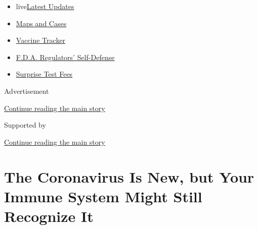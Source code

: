\begin{itemize}
\tightlist
\item
  live\href{https://www.nytimes3xbfgragh.onion/2020/09/11/world/covid-19-coronavirus.html?name=styln-coronavirus-national\&region=TOP_BANNER\&block=storyline_menu_recirc\&action=click\&pgtype=Article\&impression_id=a73af7b0-f4bc-11ea-a147-e379c6aa6545\&variant=undefined}{Latest
  Updates}
\item
  \href{https://www.nytimes3xbfgragh.onion/interactive/2020/us/coronavirus-us-cases.html?name=styln-coronavirus-national\&region=TOP_BANNER\&block=storyline_menu_recirc\&action=click\&pgtype=Article\&impression_id=a73af7b1-f4bc-11ea-a147-e379c6aa6545\&variant=undefined}{Maps
  and Cases}
\item
  \href{https://www.nytimes3xbfgragh.onion/interactive/2020/science/coronavirus-vaccine-tracker.html?name=styln-coronavirus-national\&region=TOP_BANNER\&block=storyline_menu_recirc\&action=click\&pgtype=Article\&impression_id=a73af7b2-f4bc-11ea-a147-e379c6aa6545\&variant=undefined}{Vaccine
  Tracker}
\item
  \href{https://www.nytimes3xbfgragh.onion/2020/09/10/us/politics/fda-coronavirus-vaccine.html?name=styln-coronavirus-national\&region=TOP_BANNER\&block=storyline_menu_recirc\&action=click\&pgtype=Article\&impression_id=a73af7b3-f4bc-11ea-a147-e379c6aa6545\&variant=undefined}{F.D.A.
  Regulators' Self-Defense}
\item
  \href{https://www.nytimes3xbfgragh.onion/2020/09/09/upshot/coronavirus-surprise-test-fees.html?name=styln-coronavirus-national\&region=TOP_BANNER\&block=storyline_menu_recirc\&action=click\&pgtype=Article\&impression_id=a73af7b4-f4bc-11ea-a147-e379c6aa6545\&variant=undefined}{Surprise
  Test Fees}
\end{itemize}

Advertisement

\protect\hyperlink{after-top}{Continue reading the main story}

Supported by

\protect\hyperlink{after-sponsor}{Continue reading the main story}

\hypertarget{the-coronavirus-is-new-but-your-immune-system-might-still-recognize-it}{%
\section{The Coronavirus Is New, but Your Immune System Might Still
Recognize
It}\label{the-coronavirus-is-new-but-your-immune-system-might-still-recognize-it}}

